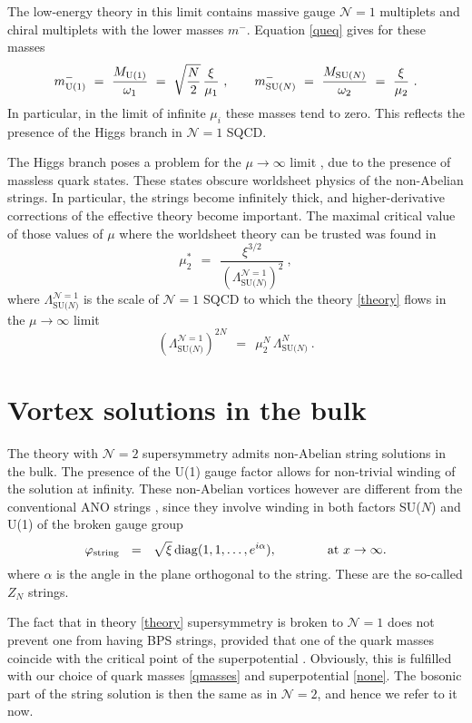 \documentclass[12pt]{article}
\def\beq{\begin{equation}}
\def\eeq{\end{equation}}
\newcommand{\ntwo}{${\mathcal N}=2$ }
\newcommand{\ntwon}{${\mathcal N}=2$}
\newcommand{\none}{${\mathcal N}=1$ }
\newcommand{\mc}[1]{\mathcal{#1}}
\newcommand{\LN}{\Lambda_\text{SU($N$)}}
\newcommand{\mUm}{m_{\rm U(1)}^{-}}
\newcommand{\mNm}{m_\text{SU($N$)}^{-}}
\newcommand{\MN}{M_\text{SU($N$)}}
\newcommand{\MU}{M_{\rm U(1)}}
\begin{document}
	The low-energy theory in this limit contains massive gauge \none multiplets and chiral multiplets
	with the lower masses $ m^- $. 
	Equation \eqref{queq} gives for these masses
\beq
\label{light}
	\mUm ~=~ \frac{\MU}{\omega_1} ~=~ \sqrt{\frac{N}{2}}\, \frac{\xi}{\mu_1}~,
	\qquad
	\mNm ~=~ \frac{\MN}{\omega_2} ~=~ \frac{\xi}{\mu_2}~.
\eeq
	In particular, in the limit of infinite $ \mu_i $ these masses tend to zero. 
	This reflects the presence of the Higgs branch in \none SQCD.

	The Higgs branch poses a problem for the $ \mu \to \infty $ limit \cite{SYnone},
	due to the presence of massless quark states.
	These states obscure worldsheet physics of the non-Abelian strings. 
	In particular, the strings become infinitely thick, and higher-derivative corrections
	of the effective theory become important.
	The maximal critical value of those values of $ \mu $ where the worldsheet theory can be 
	trusted was found in \cite{SYnone}
\[
	\mu_2^* ~~=~~ \frac{\xi^{3/2}}{\left(\Lambda_\text{SU($N$)}^{\mc{N}=1}\right)^2}~,
\]
	where $ \Lambda_\text{SU($N$)}^{\mc{N}=1} $ is the scale of \none SQCD to which the theory
	\eqref{theory} flows in the $ \mu \to \infty $ limit
\[
	\left(\Lambda_\text{SU($N$)}^{\mc{N}=1}\right)^{2N} ~~=~~ \mu_2^N\, \LN^N~.
\]

%
%
\section{Vortex solutions in the bulk}
\label{vortex}
\setcounter{equation}{0}

	The theory with \ntwo supersymmetry admits non-Abelian string solutions in the bulk.
	The presence of the U(1) gauge factor allows for non-trivial winding of the solution
	at infinity.
	These non-Abelian vortices however are different from the conventional ANO strings \cite{ANO}, 
	since they involve winding in both factors SU($N$) and U(1) of the broken gauge group
\[
	\varphi_{\rm string} ~~=~~ \sqrt{\xi}\,{\rm diag}(1, 1, \dots, e^{i\alpha}), 
		\qquad\qquad \text{at $x \to \infty$}.
\]
	where $ \alpha $ is the angle in the plane orthogonal to the string.
	These are the so-called $ Z_N $ strings.

	The fact that in theory \eqref{theory} supersymmetry is broken to \none does not prevent
	one from having BPS strings, provided that one of the quark masses 
	coincide with the critical point of the superpotential \cite{Edalati}.
	Obviously, this is fulfilled with our choice of quark masses \eqref{qmasses} and superpotential
	\eqref{none}.
	The bosonic part of the string solution is then the same as in \ntwon, and hence we 
	refer to it now.
\end{document}

